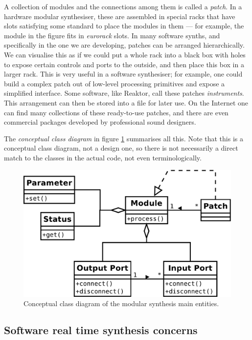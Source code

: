 A collection of modules and the connections among them is called a
\emph{patch}. In a hardware modular synthesiser, these are assembled
in special racks that have slots satisfying some standard to place the
modules in them --- for example, the module in the figure fits in
\emph{eurorack} slots. In many software synths, and specifically in
the one we are developing, patches can be arranged hierarchically. We
can visualise this as if we could put a whole rack into a black box
with holes to expose certain controls and ports to the outside, and
then place this box in a larger rack. This is very useful in a
software synthesiser; for example, one could build a complex patch out
of low-level processing primitives and expose a simplified
interface. Some software, like Reaktor, call these patches
\emph{instruments}. This arrangement can then be stored into a file
for later use. On the Internet one can find many collections of these
ready-to-use patches, and there are even commercial packages developed
by professional sound designers.

The \emph{conceptual class diagram} in figure \ref{fig:graphconcept}
summarises all this. Note that this is a conceptual class diagram, not
a design one, so there is not necessarily a direct match to the
classes in the actual code, not even terminologically.

\begin{figure}[h]
  \centering
  \includegraphics[width=.9\textwidth]{pic/graph-concept.pdf}
  \caption{Conceptual class diagram of the modular synthesis main entities.}
  \label{fig:graphconcept}
\end{figure}

\subsection{Software real time synthesis concerns}
\label{sec:rtsynth}

